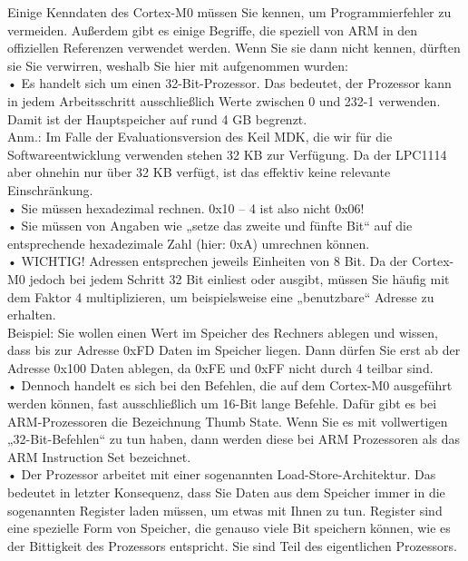 Einige Kenndaten des Cortex-M0 müssen Sie kennen, um Programmierfehler zu vermeiden. Außerdem gibt es einige Begriffe, die speziell von ARM in den offiziellen Referenzen verwendet werden. Wenn Sie sie dann nicht kennen, dürften sie Sie verwirren, weshalb Sie hier mit aufgenommen wurden:\\

•	Es handelt sich um einen 32-Bit-Prozessor. Das bedeutet, der Prozessor kann in jedem Arbeitsschritt ausschließlich Werte zwischen 0 und 232-1 verwenden. Damit ist der Hauptspeicher auf rund 4 GB begrenzt.\\

Anm.: Im Falle der Evaluationsversion des Keil MDK, die wir für die Softwareentwicklung verwenden stehen 32 KB zur Verfügung. Da der LPC1114 aber ohnehin nur über 32 KB verfügt, ist das effektiv keine relevante Einschränkung.\\

•	Sie müssen hexadezimal rechnen. 0x10 – 4 ist also nicht 0x06!\\

•	Sie müssen von Angaben wie „setze das zweite und fünfte Bit“ auf die entsprechende hexadezimale Zahl (hier: 0xA) umrechnen können.\\

•	WICHTIG! Adressen entsprechen jeweils Einheiten von 8 Bit. Da der Cortex-M0 jedoch bei jedem Schritt 32 Bit einliest oder ausgibt, müssen Sie häufig mit dem Faktor 4 multiplizieren, um beispielsweise eine „benutzbare“ Adresse zu erhalten.\\

Beispiel: Sie wollen einen Wert im Speicher des Rechners ablegen und wissen, dass bis zur Adresse 0xFD Daten im Speicher liegen. Dann dürfen Sie erst ab der Adresse 0x100 Daten ablegen, da 0xFE und 0xFF nicht durch 4 teilbar sind.\\

•	Dennoch handelt es sich bei den Befehlen, die auf dem Cortex-M0 ausgeführt werden können, fast ausschließlich um 16-Bit lange Befehle. Dafür gibt es bei ARM-Prozessoren die Bezeichnung Thumb State. Wenn Sie es mit vollwertigen „32-Bit-Befehlen“ zu tun haben, dann werden diese bei ARM Prozessoren als das ARM Instruction Set bezeichnet.\\
 
•	Der Prozessor arbeitet mit einer sogenannten Load-Store-Architektur. Das bedeutet in letzter Konsequenz, dass Sie Daten aus dem Speicher immer in die sogenannten Register laden müssen, um etwas mit Ihnen zu tun. Register sind eine spezielle Form von Speicher, die genauso viele Bit speichern können, wie es der Bittigkeit des Prozessors entspricht. Sie sind Teil des eigentlichen Prozessors.\\

